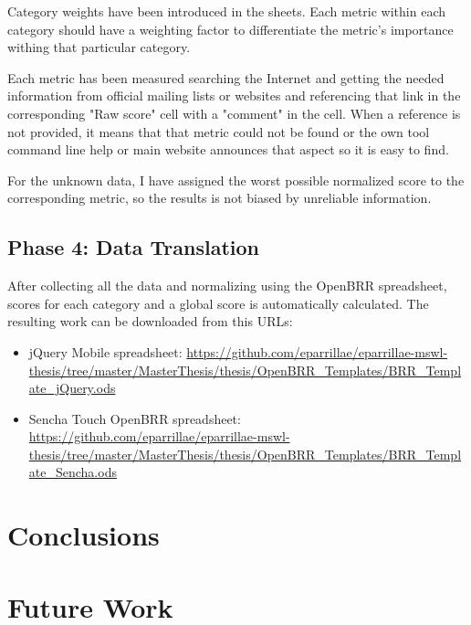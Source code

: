 \documentclass[a4paper,12pt]{book}
\begin{document}
Category weights have been introduced in the sheets. Each metric within each category should have a weighting factor to differentiate the metric's importance withing that particular category. 

Each metric has been measured searching the Internet and getting the needed information from official mailing lists or websites and referencing that link in the corresponding "Raw score" cell with a "comment" in the cell. When a reference is not provided, it means that that metric could not be found or the own tool command line help or main website announces that aspect so it is easy to find.

For the unknown data, I have assigned the worst possible normalized score to the corresponding metric, so the results is not biased by unreliable information.

\section{Phase 4: Data Translation}
\label{sec:phase4}

After collecting all the data and normalizing using the OpenBRR spreadsheet,
scores for each category and a global score is automatically calculated.
The resulting work can be downloaded from this URLs:

\begin{itemize}
 \item jQuery Mobile spreadsheet:
\url{
https://github.com/eparrillae/eparrillae-mswl-thesis/tree/master/MasterThesis/thesis/OpenBRR_Templates/BRR_Template_jQuery.ods}

 \item Sencha Touch OpenBRR spreadsheet:
\url{
https://github.com/eparrillae/eparrillae-mswl-thesis/tree/master/MasterThesis/thesis/OpenBRR_Templates/BRR_Template_Sencha.ods}
\end{itemize}



\chapter{Conclusions}
\label{chap:conclusions}




\chapter{Future Work}
\label{chap:future}
\end{document}
